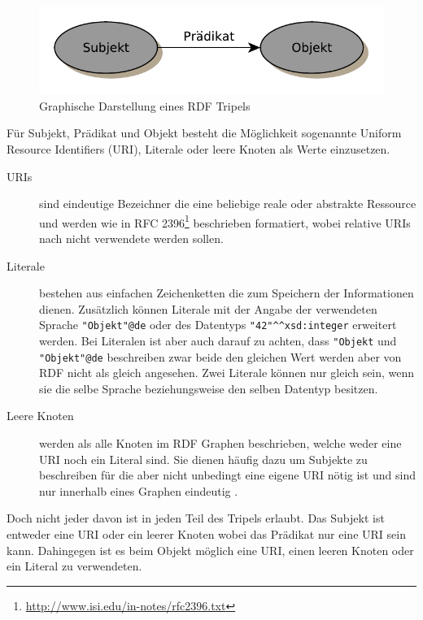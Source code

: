 \medskip

\begin{figure}[h]
    \centering
    \includegraphics[scale=0.7]{assets/images/rdf-triple}
    \caption{Graphische Darstellung eines RDF Tripels}
    \label{fig:graphische_darstellung_eines_rdf_tripels}
\end{figure} 

Für Subjekt, Prädikat und Objekt besteht die Möglichkeit sogenannte Uniform Resource Identifiers (URI), Literale oder leere Knoten als Werte einzusetzen. 

\begin{description}
    \item[URIs] sind eindeutige Bezeichner die eine beliebige reale oder abstrakte Ressource und werden wie in RFC 2396\footnote{\url{http://www.isi.edu/in-notes/rfc2396.txt}} beschrieben formatiert, wobei relative URIs nach \cite{Klyne2004} nicht verwendete werden sollen.
    \item[Literale] bestehen aus einfachen Zeichenketten die zum Speichern der Informationen dienen. Zusätzlich können Literale mit der Angabe der verwendeten Sprache \lstinline[basicstyle=\ttfamily]{"Objekt"@de} oder des Datentyps \lstinline[basicstyle=\ttfamily]{"42"^^xsd:integer} erweitert werden. Bei Literalen ist aber auch darauf zu achten, dass \lstinline[basicstyle=\ttfamily]{"Objekt} und \lstinline[basicstyle=\ttfamily]{"Objekt"@de} beschreiben zwar beide den gleichen Wert werden aber von RDF nicht als gleich angesehen. Zwei Literale können nur gleich sein, wenn sie die selbe Sprache beziehungsweise den selben Datentyp besitzen.  
    \item[Leere Knoten] werden als alle Knoten im RDF Graphen beschrieben, welche weder eine URI noch ein Literal sind. Sie dienen häufig dazu um Subjekte zu beschreiben für die aber nicht unbedingt eine eigene URI nötig ist und sind nur innerhalb eines Graphen eindeutig .
\end{description}

Doch nicht jeder davon ist in jeden Teil des Tripels erlaubt. Das Subjekt ist entweder eine URI oder ein leerer Knoten wobei das Prädikat nur eine URI sein kann. Dahingegen ist es beim Objekt möglich eine URI, einen leeren Knoten oder ein Literal zu verwendeten. 

